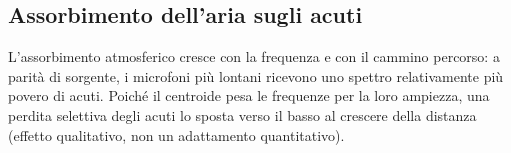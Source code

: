 \documentclass[11pt,a4paper]{article}
\begin{document}
\subsection{Assorbimento dell'aria sugli acuti}
L'assorbimento atmosferico cresce con la frequenza e con il cammino percorso: a parità di
sorgente, i microfoni più lontani ricevono uno spettro relativamente più povero di acuti.
Poiché il centroide pesa le frequenze per la loro ampiezza, una perdita selettiva degli
acuti lo sposta verso il basso al crescere della distanza (effetto qualitativo, non un
adattamento quantitativo).
\end{document}
